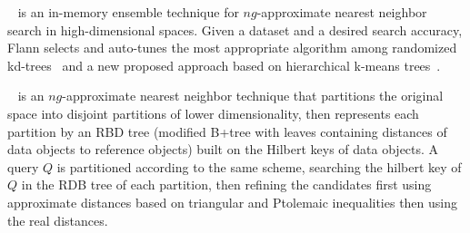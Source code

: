 {\color {black} ~\cite{flann} is an in-memory ensemble technique for $ng$-approximate nearest neighbor search in high-dimensional spaces. Given a dataset and a desired search accuracy, Flann selects and auto-tunes the most appropriate algorithm among randomized kd-trees~\cite{random-kd-trees} and a new proposed approach based on hierarchical k-means trees~\cite{flann}.}

{\color {black} ~\cite{hdindex} is an $ng$-approximate nearest neighbor technique that partitions the original space into disjoint partitions of lower dimensionality, then represents each partition by an RBD tree (modified B+tree with leaves containing distances of data objects to reference objects) built on the Hilbert keys of data objects. A query $Q$ is partitioned according to the same scheme, %
searching the hilbert key of $Q$ in the RDB tree of each partition, then refining the candidates first using approximate distances based on triangular and Ptolemaic inequalities then using the real distances.}

